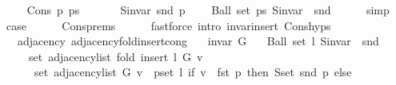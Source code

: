 \begin{isabellebody}
\isamarkupfalse%
\isanewline
\ \ \isamarkupfalse%
\ {\isacharparenleft}{\kern0pt}Cons\ p\ ps{\isacharparenright}{\kern0pt}\isanewline
\ \ \isamarkupfalse%
\isanewline
\ \ \ \ {\isachardoublequoteopen}S{\isachardot}{\kern0pt}invar\ {\isacharparenleft}{\kern0pt}snd\ p{\isacharparenright}{\kern0pt}{\isachardoublequoteclose}\isanewline
\ \ \ \ {\isachardoublequoteopen}Ball\ {\isacharparenleft}{\kern0pt}set\ ps{\isacharparenright}{\kern0pt}\ {\isacharparenleft}{\kern0pt}S{\isachardot}{\kern0pt}invar\ {\isasymcirc}\ snd{\isacharparenright}{\kern0pt}{\isachardoublequoteclose}\isanewline
\ \ \ \ \isamarkupfalse%
\ simp{\isacharplus}{\kern0pt}\isanewline
\ \ \isamarkupfalse%
{\isacharquery}{\kern0pt}case\isanewline
\ \ \ \ \isamarkupfalse%
\ Cons{\isachardot}{\kern0pt}prems{\isacharparenleft}{\kern0pt}{}{\isacharparenright}{\kern0pt}\isanewline
\ \ \ \ \isamarkupfalse%
\ {\isacharparenleft}{\kern0pt}fastforce\ intro{\isacharcolon}{\kern0pt}\ invar{\isacharunderscore}{\kern0pt}insert{\isacharunderscore}{\kern0pt}{}\ Cons{\isachardot}{\kern0pt}hyps{\isacharparenright}{\kern0pt}\isanewline
{}\isamarkupfalse%
%
\endisatagproof
{\isafoldproof}%
%
\isadelimproof
\isanewline
%
\endisadelimproof
\isanewline
{}\isamarkupfalse%
\ {\isacharparenleft}{\kern0pt}\ adjacency{\isacharparenright}{\kern0pt}\ adjacency{\isacharunderscore}{\kern0pt}fold{\isacharunderscore}{\kern0pt}insert{\isacharunderscore}{\kern0pt}{}{\isacharunderscore}{\kern0pt}cong{\isacharcolon}{\kern0pt}\isanewline
\ \ \ {\isachardoublequoteopen}invar\ G{\isachardoublequoteclose}\isanewline
\ \ \ {\isachardoublequoteopen}Ball\ {\isacharparenleft}{\kern0pt}set\ l{\isacharparenright}{\kern0pt}\ {\isacharparenleft}{\kern0pt}S{\isachardot}{\kern0pt}invar\ {\isasymcirc}\ snd{\isacharparenright}{\kern0pt}{\isachardoublequoteclose}\isanewline
\ \ \isanewline
\ \ \ \ {\isachardoublequoteopen}set\ {\isacharparenleft}{\kern0pt}adjacency{\isacharunderscore}{\kern0pt}list\ {\isacharparenleft}{\kern0pt}fold\ insert{\isacharunderscore}{\kern0pt}{}\ l\ G{\isacharparenright}{\kern0pt}\ v{\isacharparenright}{\kern0pt}\ {\isacharequal}{\kern0pt}\isanewline
\ \ \ \ \ set\ {\isacharparenleft}{\kern0pt}adjacency{\isacharunderscore}{\kern0pt}list\ G\ v{\isacharparenright}{\kern0pt}\ {\isasymunion}\ {\isacharparenleft}{\kern0pt}{\isasymUnion}p{\isasymin}set\ l{\isachardot}{\kern0pt}\ if\ v\ {\isacharequal}{\kern0pt}\ fst\ p\ then\ S{\isachardot}{\kern0pt}set\ {\isacharparenleft}{\kern0pt}snd\ p{\isacharparenright}{\kern0pt}\ else\ {\isacharbraceleft}{\kern0pt}{\isacharbraceright}{\kern0pt}{\isacharparenright}{\kern0pt}{\isachardoublequoteclose}\isanewline

\end{isabellebody}
